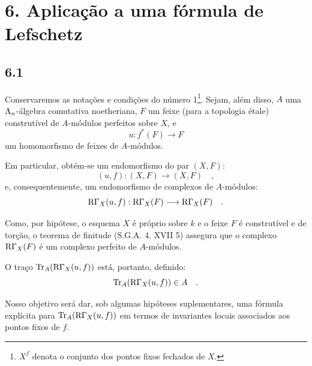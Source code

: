 \section*{6. Aplicação a uma fórmula de Lefschetz}

\subsection*{6.1}
Conservaremos as notações e condições do número 1\footnote{$X^f$ denota o conjunto dos pontos fixos fechados de $X$.}. Sejam, além disso, $A$ uma $\Lambda_n$-álgebra comutativa noetheriana, $F$ um feixe (para a topologia étale) construtível de $A$-módulos perfeitos sobre $X$, e
\[
u : f^*(F) \longrightarrow F
\]
um homomorfismo de feixes de $A$-módulos.

Em particular, obtém-se um endomorfismo do par $(X, F)$:
\[
(u, f) : (X, F) \longrightarrow (X, F) \quad ,
\]
e, consequentemente, um endomorfismo de complexos de $A$-módulos:
\[
\mathrm{R}\Gamma_X(u, f) : \mathrm{R}\Gamma_X(F) \longrightarrow \mathrm{R}\Gamma_X(F) \quad .
\]

Como, por hipótese, o esquema $X$ é próprio sobre $k$ e o feixe $F$ é construtível e de torção, o teorema de finitude (S.G.A. 4. XVII 5) assegura que o complexo $\mathrm{R}\Gamma_X(F)$ é um complexo perfeito de $A$-módulos.

O traço $\operatorname{Tr}_A(\mathrm{R}\Gamma_X(u, f))$ está, portanto, definido:
\[
\operatorname{Tr}_A(\mathrm{R}\Gamma_X(u, f)) \in A \quad .
\]

Nosso objetivo será dar, sob algumas hipóteses suplementares, uma fórmula explícita para $\operatorname{Tr}_A(\mathrm{R}\Gamma_X(u, f))$ em termos de invariantes locais associados aos pontos fixos de $f$.
